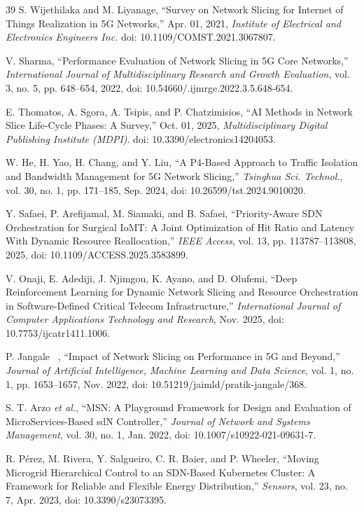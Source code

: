 \documentclass[conference]{IEEEtran}
\begin{document}
\begin{thebibliography}{39}
 S. Wijethilaka and M. Liyanage, ``Survey on Network Slicing for Internet of Things Realization in 5G Networks,'' Apr. 01, 2021, \emph{Institute of Electrical and Electronics Engineers Inc.} doi: 10.1109/COMST.2021.3067807.

 V. Sharma, ``Performance Evaluation of Network Slicing in 5G Core Networks,'' \emph{International Journal of Multidisciplinary Research and Growth Evaluation}, vol. 3, no. 5, pp. 648--654, 2022, doi: 10.54660/.ijmrge.2022.3.5.648-654.

 E. Thomatos, A. Sgora, A. Tsipis, and P. Chatzimisios, ``AI Methods in Network Slice Life-Cycle Phases: A Survey,'' Oct. 01, 2025, \emph{Multidisciplinary Digital Publishing Institute (MDPI)}. doi: 10.3390/electronics14204053.

 W. He, H. Yao, H. Chang, and Y. Liu, ``A P4-Based Approach to Traffic Isolation and Bandwidth Management for 5G Network Slicing,'' \emph{Tsinghua Sci. Technol.}, vol. 30, no. 1, pp. 171--185, Sep. 2024, doi: 10.26599/tst.2024.9010020.

 Y. Safaei, P. Arefijamal, M. Siamaki, and B. Safaei, ``Priority-Aware SDN Orchestration for Surgical IoMT: A Joint Optimization of Hit Ratio and Latency With Dynamic Resource Reallocation,'' \emph{IEEE Access}, vol. 13, pp. 113787--113808, 2025, doi: 10.1109/ACCESS.2025.3583899.

 V. Onaji, E. Adediji, J. Njimgou, K. Ayano, and D. Olufemi, ``Deep Reinforcement Learning for Dynamic Network Slicing and Resource Orchestration in Software-Defined Critical Telecom Infrastructure,'' \emph{International Journal of Computer Applications Technology and Research}, Nov. 2025, doi: 10.7753/ijcatr1411.1006.

 P. Jangale~ , ``Impact of Network Slicing on Performance in 5G and Beyond,'' \emph{Journal of Artificial Intelligence, Machine Learning and Data Science}, vol. 1, no. 1, pp. 1653--1657, Nov. 2022, doi: 10.51219/jaimld/pratik-jangale/368.

 S. T. Arzo \emph{et al.}, ``MSN: A Playground Framework for Design and Evaluation of MicroServices-Based sdN Controller,'' \emph{Journal of Network and Systems Management}, vol. 30, no. 1, Jan. 2022, doi: 10.1007/s10922-021-09631-7.

 R. Pérez, M. Rivera, Y. Salgueiro, C. R. Baier, and P. Wheeler, ``Moving Microgrid Hierarchical Control to an SDN-Based Kubernetes Cluster: A Framework for Reliable and Flexible Energy Distribution,'' \emph{Sensors}, vol. 23, no. 7, Apr. 2023, doi: 10.3390/s23073395.


\end{thebibliography}
\end{document}
